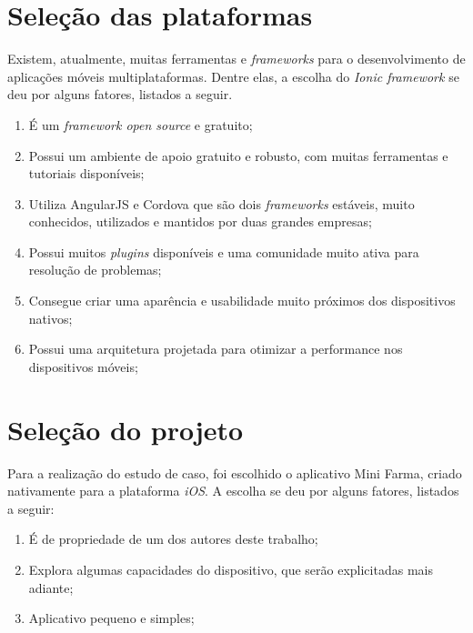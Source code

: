 \section{Seleção das plataformas} \label{subsec:selecaodasplataformas}

Existem, atualmente, muitas ferramentas e \textit{frameworks} para o desenvolvimento de aplicações móveis multiplataformas. Dentre elas, a escolha do \textit{Ionic framework} se deu por alguns fatores, listados a seguir. 

\begin{enumerate}
    \item É um \textit{framework open source} e gratuito;
    \item Possui um ambiente de apoio gratuito e robusto, com muitas ferramentas e tutoriais disponíveis;
    \item Utiliza AngularJS e Cordova que são dois \textit{frameworks} estáveis, muito conhecidos, utilizados e mantidos por duas grandes empresas;
    \item Possui muitos \textit{plugins} disponíveis e uma comunidade muito ativa para resolução de problemas; %
    \item Consegue criar uma aparência e usabilidade muito próximos dos dispositivos nativos; %
    \item Possui uma arquitetura projetada para otimizar a performance nos dispositivos móveis; 
\end{enumerate}

\section{Seleção do projeto} \label{subsec:selecaodoprojeto}

Para a realização do estudo de caso, foi escolhido o aplicativo Mini Farma, criado nativamente para a plataforma \textit{iOS}. A escolha se deu por alguns fatores, listados a seguir:

\begin{enumerate}
    \item É de propriedade de um dos autores deste trabalho;
    \item Explora algumas capacidades do dispositivo, que serão explicitadas mais adiante;
    \item Aplicativo pequeno e simples;
\end{enumerate}
 